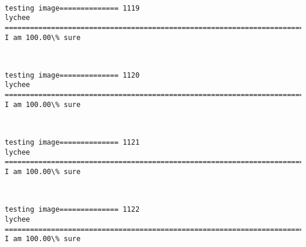 \documentclass[11pt]{article}
\begin{document}
    \begin{center}
    \end{center}
    { \hspace*{\fill} \\}
    
    \begin{Verbatim}[commandchars=\\\{\}]
testing image============== 1119
lychee
============================================================================
I am 100.00\% sure

    \end{Verbatim}

    \begin{center}
    \end{center}
    { \hspace*{\fill} \\}
    
    \begin{Verbatim}[commandchars=\\\{\}]
testing image============== 1120
lychee
============================================================================
I am 100.00\% sure

    \end{Verbatim}

    \begin{center}
    \end{center}
    { \hspace*{\fill} \\}
    
    \begin{Verbatim}[commandchars=\\\{\}]
testing image============== 1121
lychee
============================================================================
I am 100.00\% sure

    \end{Verbatim}

    \begin{center}
    \end{center}
    { \hspace*{\fill} \\}
    
    \begin{Verbatim}[commandchars=\\\{\}]
testing image============== 1122
lychee
============================================================================
I am 100.00\% sure

    \end{Verbatim}
\end{document}
